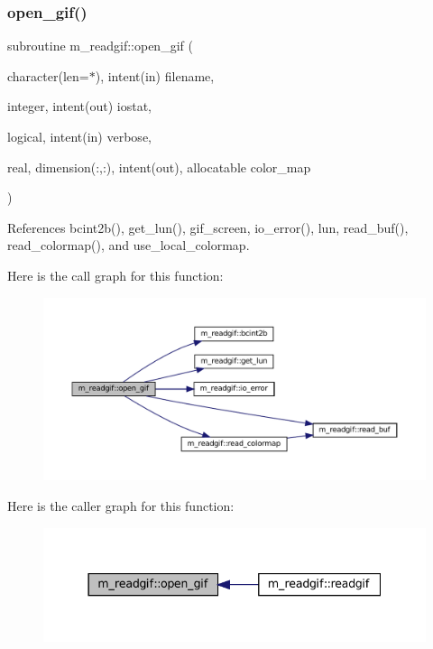 \subsubsection{\texorpdfstring{open\+\_\+gif()}{open\_gif()}}
{\footnotesize\ttfamily subroutine m\+\_\+readgif\+::open\+\_\+gif (\begin{DoxyParamCaption}\item[{character(len=$\ast$), intent(in)}]{filename,  }\item[{integer, intent(out)}]{iostat,  }\item[{logical, intent(in)}]{verbose,  }\item[{real, dimension(\+:,\+:), intent(out), allocatable}]{color\+\_\+map }\end{DoxyParamCaption})\hspace{0.3cm}{\ttfamily [private]}}



References bcint2b(), get\+\_\+lun(), gif\+\_\+screen, io\+\_\+error(), lun, read\+\_\+buf(), read\+\_\+colormap(), and use\+\_\+local\+\_\+colormap.

Here is the call graph for this function\+:
\nopagebreak
\begin{figure}[H]
\begin{center}
\leavevmode
\includegraphics[width=350pt]{namespacem__readgif_ae008e851af60f4d8fdeeb4fd96b8580d_cgraph}
\end{center}
\end{figure}
Here is the caller graph for this function\+:
\nopagebreak
\begin{figure}[H]
\begin{center}
\leavevmode
\includegraphics[width=337pt]{namespacem__readgif_ae008e851af60f4d8fdeeb4fd96b8580d_icgraph}
\end{center}
\end{figure}
\mbox{\label{namespacem__readgif_a272a4dbcc1419d3d103db4c50b757805}} 
